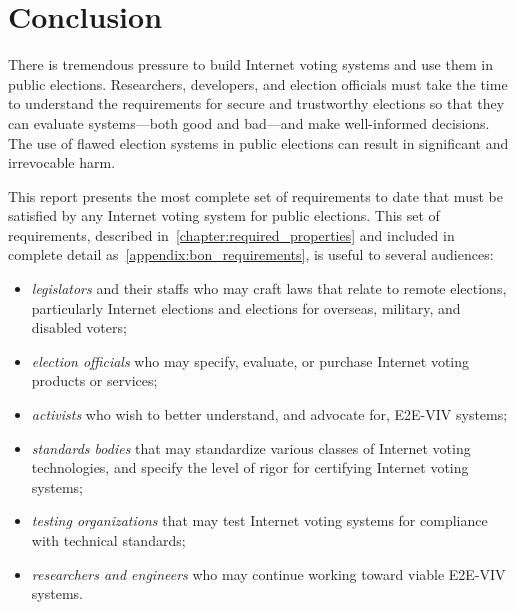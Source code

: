 \chapter{Conclusion}
\label{chapter:conclusion}

There is tremendous pressure to build Internet voting systems and use
them in public elections. Researchers, developers, and election
officials must take the time to understand the requirements for secure
and trustworthy elections so that they can evaluate systems---both
good and bad---and make well-informed decisions.  The use of flawed
election systems in public elections can result in significant and
irrevocable harm.

This report presents the most complete set of requirements to
date that must be satisfied by any Internet voting system for public
elections. This set of requirements, described
in~\autoref{chapter:required_properties} and included in complete
detail as~\autoref{appendix:bon_requirements}, is useful to several
audiences:
\begin{itemize}
\item \emph{legislators} and their staffs who may craft laws that
  relate to remote elections, particularly Internet elections and
  elections for overseas, military, and disabled voters;
\item \emph{election officials} who may specify, evaluate, or
  purchase Internet voting products or services;
\item \emph{activists} who wish to better understand, and advocate
  for, E2E-VIV systems;
\item \emph{standards bodies} that may standardize various classes of
  Internet voting technologies, and specify the level of rigor for
  certifying Internet voting systems;
\item \emph{testing organizations} that may test Internet voting
  systems for compliance with technical standards;
\item \emph{researchers and engineers} who may continue working
  toward viable E2E-VIV systems.
\end{itemize}

